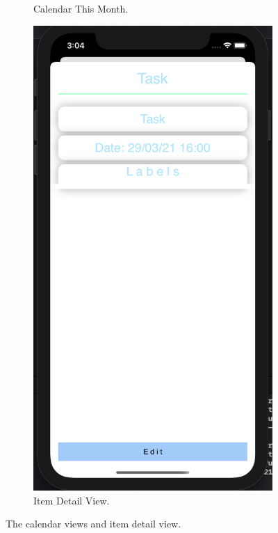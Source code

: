 \begin{figure}[H]
\begin{subfigure}[b]{0.3\textwidth}
        \caption{Calendar This Month.}
        \label{fig:cal_this_month_app}
    \end{subfigure}
    \hfill
    \begin{subfigure}[b]{0.3\textwidth}
        \centering
        \includegraphics[width=\textwidth]{./graphics/Implementation/Dashboard/task detail.png}
        \caption{Item Detail View.}
        \label{fig:item_detail_app}
    \end{subfigure}
    
    \caption{The calendar views and item detail view.}
    \label{fig:cal_item_app}
\end{figure}